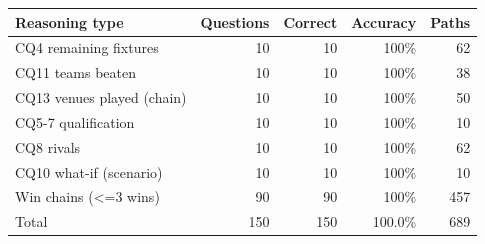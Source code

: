 {\small
\begin{tabular}{lrrrr}
\toprule
\textbf{Reasoning type} & \textbf{Questions} & \textbf{Correct} & \textbf{Accuracy} & \textbf{Paths} \\
\midrule
CQ4 remaining fixtures & 10 & 10 & 100\% & 62 \\
CQ11 teams beaten & 10 & 10 & 100\% & 38 \\
CQ13 venues played (chain) & 10 & 10 & 100\% & 50 \\
CQ5-7 qualification & 10 & 10 & 100\% & 10 \\
CQ8 rivals & 10 & 10 & 100\% & 62 \\
CQ10 what-if (scenario) & 10 & 10 & 100\% & 10 \\
Win chains (\textless{}=3 wins) & 90 & 90 & 100\% & 457 \\
Total & 150 & 150 & 100.0\% & 689 \\
\bottomrule
\end{tabular}}
